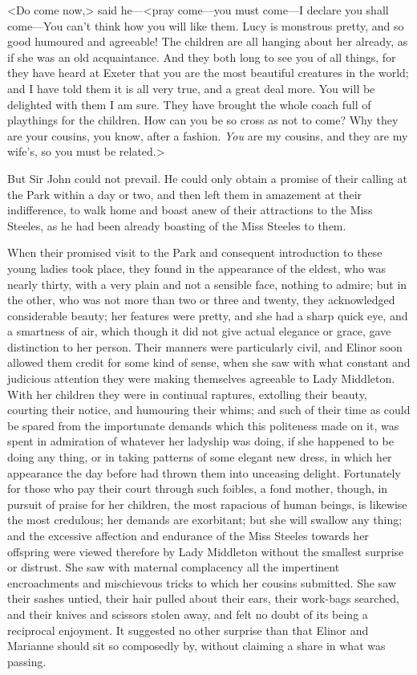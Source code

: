 <Do come now,> said he—<pray come—you must come—I declare you shall come—You can't think how you will like them. Lucy is monstrous pretty, and so good humoured and agreeable! The children are all hanging about her already, as if she was an old acquaintance. And they both long to see you of all things, for they have heard at Exeter that you are the most beautiful creatures in the world; and I have told them it is all very true, and a great deal more. You will be delighted with them I am sure. They have brought the whole coach full of playthings for the children. How can you be so cross as not to come? Why they are your cousins, you know, after a fashion. \textit{You} are my cousins, and they are my wife's, so you must be related.>

But Sir John could not prevail. He could only obtain a promise of their calling at the Park within a day or two, and then left them in amazement at their indifference, to walk home and boast anew of their attractions to the Miss Steeles, as he had been already boasting of the Miss Steeles to them.

When their promised visit to the Park and consequent introduction to these young ladies took place, they found in the appearance of the eldest, who was nearly thirty, with a very plain and not a sensible face, nothing to admire; but in the other, who was not more than two or three and twenty, they acknowledged considerable beauty; her features were pretty, and she had a sharp quick eye, and a smartness of air, which though it did not give actual elegance or grace, gave distinction to her person. Their manners were particularly civil, and Elinor soon allowed them credit for some kind of sense, when she saw with what constant and judicious attention they were making themselves agreeable to Lady Middleton. With her children they were in continual raptures, extolling their beauty, courting their notice, and humouring their whims; and such of their time as could be spared from the importunate demands which this politeness made on it, was spent in admiration of whatever her ladyship was doing, if she happened to be doing any thing, or in taking patterns of some elegant new dress, in which her appearance the day before had thrown them into unceasing delight. Fortunately for those who pay their court through such foibles, a fond mother, though, in pursuit of praise for her children, the most rapacious of human beings, is likewise the most credulous; her demands are exorbitant; but she will swallow any thing; and the excessive affection and endurance of the Miss Steeles towards her offspring were viewed therefore by Lady Middleton without the smallest surprise or distrust. She saw with maternal complacency all the impertinent encroachments and mischievous tricks to which her cousins submitted. She saw their sashes untied, their hair pulled about their ears, their work-bags searched, and their knives and scissors stolen away, and felt no doubt of its being a reciprocal enjoyment. It suggested no other surprise than that Elinor and Marianne should sit so composedly by, without claiming a share in what was passing.

